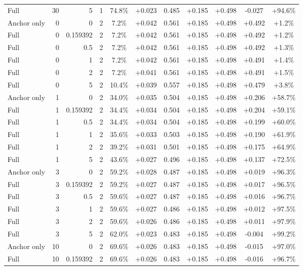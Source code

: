 \begin{table}[htbp]
\begin{tabular}{lrrrccccccc}
Full & 30 & 5 & 1 & 74.8\% & +0.023 & 0.485 & +0.185 & +0.498 & -0.027 & +94.6\% \\
Anchor only & 0 & 0 & 2 & 7.2\% & +0.042 & 0.561 & +0.185 & +0.498 & +0.492 & +1.2\% \\
Full & 0 & 0.159392 & 2 & 7.2\% & +0.042 & 0.561 & +0.185 & +0.498 & +0.492 & +1.2\% \\
Full & 0 & 0.5 & 2 & 7.2\% & +0.042 & 0.561 & +0.185 & +0.498 & +0.492 & +1.3\% \\
Full & 0 & 1 & 2 & 7.2\% & +0.042 & 0.561 & +0.185 & +0.498 & +0.491 & +1.4\% \\
Full & 0 & 2 & 2 & 7.2\% & +0.041 & 0.561 & +0.185 & +0.498 & +0.491 & +1.5\% \\
Full & 0 & 5 & 2 & 10.4\% & +0.039 & 0.557 & +0.185 & +0.498 & +0.479 & +3.8\% \\
Anchor only & 1 & 0 & 2 & 34.0\% & +0.035 & 0.504 & +0.185 & +0.498 & +0.206 & +58.7\% \\
Full & 1 & 0.159392 & 2 & 34.4\% & +0.034 & 0.504 & +0.185 & +0.498 & +0.204 & +59.1\% \\
Full & 1 & 0.5 & 2 & 34.4\% & +0.034 & 0.504 & +0.185 & +0.498 & +0.199 & +60.0\% \\
Full & 1 & 1 & 2 & 35.6\% & +0.033 & 0.503 & +0.185 & +0.498 & +0.190 & +61.9\% \\
Full & 1 & 2 & 2 & 39.2\% & +0.031 & 0.501 & +0.185 & +0.498 & +0.175 & +64.9\% \\
Full & 1 & 5 & 2 & 43.6\% & +0.027 & 0.496 & +0.185 & +0.498 & +0.137 & +72.5\% \\
Anchor only & 3 & 0 & 2 & 59.2\% & +0.028 & 0.487 & +0.185 & +0.498 & +0.019 & +96.3\% \\
Full & 3 & 0.159392 & 2 & 59.2\% & +0.027 & 0.487 & +0.185 & +0.498 & +0.017 & +96.5\% \\
Full & 3 & 0.5 & 2 & 59.6\% & +0.027 & 0.487 & +0.185 & +0.498 & +0.016 & +96.7\% \\
Full & 3 & 1 & 2 & 59.6\% & +0.027 & 0.486 & +0.185 & +0.498 & +0.012 & +97.5\% \\
Full & 3 & 2 & 2 & 59.6\% & +0.026 & 0.486 & +0.185 & +0.498 & +0.011 & +97.9\% \\
Full & 3 & 5 & 2 & 62.0\% & +0.023 & 0.483 & +0.185 & +0.498 & -0.004 & +99.2\% \\
Anchor only & 10 & 0 & 2 & 69.6\% & +0.026 & 0.483 & +0.185 & +0.498 & -0.015 & +97.0\% \\
Full & 10 & 0.159392 & 2 & 69.6\% & +0.026 & 0.483 & +0.185 & +0.498 & -0.016 & +96.7\% \\

\end{tabular}
\end{table}
